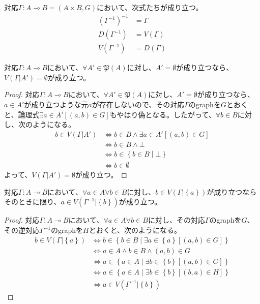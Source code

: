 \documentclass[dvipdfmx]{jsarticle}
\begin{document}
\begin{thm*}
対応$\varGamma:A \multimap B = (A \times B,G)$において、次式たちが成り立つ。
\begin{align*}
\left( \varGamma^{- 1} \right)^{- 1} &= \varGamma\\
D\left( \varGamma^{- 1} \right) &= V(\varGamma)\\
V\left( \varGamma^{- 1} \right) &= D(\varGamma)
\end{align*}
\end{thm*}
\begin{thm}\label{1.2.3.1}
対応$\varGamma:A \multimap B$において、$\forall A'\in \mathfrak{P}(A)$に対し、$A'=\emptyset $が成り立つなら、$V(\varGamma |A')=\emptyset $が成り立つ。
\end{thm}
\begin{proof}
対応$\varGamma:A \multimap B$において、$\forall A'\in \mathfrak{P}(A)$に対し、$A' = \emptyset$が成り立つなら、$a \in A'$が成り立つような元$a$が存在しないので、その対応$\varGamma$のgraphを$G$とおくと、論理式$\exists a \in A'\left[ (a,b) \in G \right]$もやはり偽となる。したがって、$\forall b \in B$に対し、次のようになる。
\begin{align*}
b \in V\left( \varGamma|A' \right) &\Leftrightarrow b \in B \land \exists a \in A'\left[ (a,b) \in G \right]\\
&\Leftrightarrow b \in B \land \bot\\
&\Leftrightarrow b \in \left\{ b \in B \middle| \bot \right\}\\
&\Leftrightarrow b \in \emptyset
\end{align*}
よって、$V\left( \varGamma|A' \right) = \emptyset$が成り立つ。
\end{proof}
\begin{thm}
\label{1.2.3.2}
対応$\varGamma:A \multimap B$において、$\forall a \in A\forall b \in B$に対し、$b \in V\left( \varGamma|\left\{ a \right\} \right)$が成り立つならそのときに限り、$a \in V\left( \varGamma^{- 1}|\left\{ b \right\} \right)$が成り立つ。
\end{thm}
\begin{proof}
対応$\varGamma:A \multimap B$において、$\forall a \in A\forall b \in B$に対し、その対応$\varGamma$のgraphを$G$、その逆対応$\varGamma^{-1}$のgraphを$H$とおくと、次のようになる。
\begin{align*}
b \in V\left( \varGamma|\left\{ a \right\} \right) &\Leftrightarrow b \in \left\{ b \in B \middle| \exists a \in \left\{ a \right\}\left[ (a,b) \in G \right] \right\}\\
&\Leftrightarrow a \in A \land b \in B \land (a,b) \in G\\
&\Leftrightarrow a \in \left\{ a \in A \middle| \exists b \in \left\{ b \right\}\left[ (a,b) \in G \right] \right\}\\
&\Leftrightarrow a \in \left\{ a \in A \middle| \exists b \in \left\{ b \right\}\left[ (b,a) \in H \right] \right\}\\
&\Leftrightarrow a \in V\left( \varGamma^{- 1}|\left\{ b \right\} \right)
\end{align*}
\end{proof}
\end{document}
